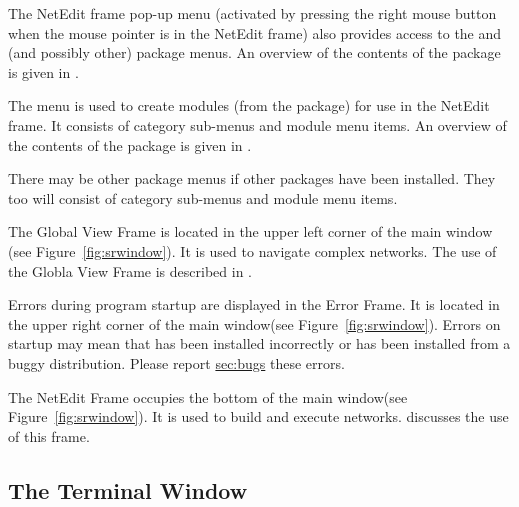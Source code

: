 \begin{description}
\begin{description}
    The NetEdit frame
    pop-up menu (activated by pressing the right mouse button when the
    mouse pointer is in the NetEdit frame) also provides access to the
    \menu{\sr{}} and \menu{\biopse{}} (and possibly other) package menus.  An
    overview of the contents of the \sr{} package is given in .
  \end{description}

  \begin{description}
     The  menu is used to create modules
    (from the \biopse package) for use in the NetEdit frame.  It
    consists of category sub-menus and module menu items.  An overview
    of the contents of the \biopse{} package is given in .
  \end{description}

  \begin{description}
      There may be other package menus if other packages
    have been installed.  They too will consist of category sub-menus
    and module menu items.
  \end{description}
  
   The Global View Frame is located in the
  upper left corner of the main window (see
  Figure~\ref{fig:srwindow}). It is used to navigate complex networks.
  The use of the Globla View Frame is described in .
  
   Errors during program startup are displayed
  in the Error Frame.  It is located in the upper right corner of the
  main window(see Figure~\ref{fig:srwindow}).  Errors on startup may
  mean that \sr{} has been installed incorrectly or has been installed
  from a buggy distribution.  Please report \hyperref{report}{(see
    Section~}{)}{sec:bugs} these errors.
  
   The NetEdit Frame occupies the bottom of
  the main window(see Figure~\ref{fig:srwindow}).  It is used to build
  and execute networks.  
  discusses the use of this frame.

\end{description}

\subsection{The Terminal Window}
\label{sec:termwinapp}

